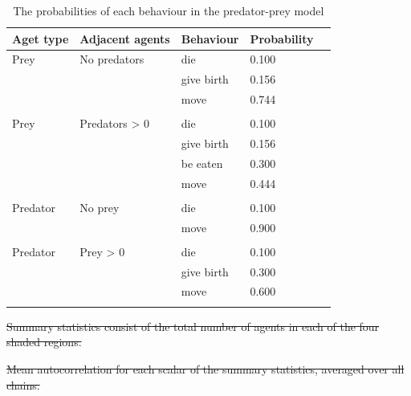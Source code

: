 \documentclass{article}
\providecommand{\DIFdeltex}[1]{{\protect\color{red}\sout{#1}}}                      %
\providecommand{\DIFdelbegin}{} %
\providecommand{\DIFdelFL}[1]{\DIFdel{#1}} %
\providecommand{\DIFaddbeginFL}{} %
\providecommand{\DIFaddendFL}{} %
\providecommand{\DIFdelendFL}{} %
\providecommand{\DIFdel}[1]{\texorpdfstring{\DIFdeltex{#1}}{}} %
\newcommand{\DIFscaledelfig}{0.5}
\newlength{\DIFdelgraphicswidth} %
\newlength{\DIFdelgraphicsheight} %
\newcommand{\DIFaddincludegraphics}[2][]{{\color{blue}\fbox{\DIFOincludegraphics[#1]{#2}}}} %
\newcommand{\DIFdelincludegraphics}[2][]{%
\sbox{\DIFdelgraphicsbox}{\DIFOincludegraphics[#1]{#2}}%
\settoboxwidth{\DIFdelgraphicswidth}{\DIFdelgraphicsbox} %
\settoboxtotalheight{\DIFdelgraphicsheight}{\DIFdelgraphicsbox} %
\scalebox{\DIFscaledelfig}{%
\parbox[b]{\DIFdelgraphicswidth}{\usebox{\DIFdelgraphicsbox}\\[-\baselineskip] \rule{\DIFdelgraphicswidth}{0em}}\llap{\resizebox{\DIFdelgraphicswidth}{\DIFdelgraphicsheight}{%
\setlength{\unitlength}{\DIFdelgraphicswidth}%
\begin{picture}(1,1)%
\thicklines\linethickness{2pt} %
{\color[rgb]{1,0,0}\put(0,0){\framebox(1,1){}}}%
{\color[rgb]{1,0,0}\put(0,0){\line( 1,1){1}}}%
{\color[rgb]{1,0,0}\put(0,1){\line(1,-1){1}}}%
\end{picture}%
}\hspace*{3pt}}} %
} %
\DeclareRobustCommand{\DIFdelbegin}{\DIFOdelbegin \let\includegraphics\DIFdelincludegraphics} %
\DeclareRobustCommand{\DIFaddbeginFL}{\DIFOaddbeginFL \let\includegraphics\DIFaddincludegraphics} %
\DeclareRobustCommand{\DIFaddendFL}{\DIFOaddendFL \let\includegraphics\DIFOincludegraphics} %
\DeclareRobustCommand{\DIFdelendFL}{\DIFOaddendFL \let\includegraphics\DIFOincludegraphics} %
\begin{document}
\DIFdelbegin %
\DIFdelendFL \DIFaddbeginFL \begin{table}[ht]
	\DIFaddendFL \begin{center}
		\begin{tabular}{llllc}
		\hline
		Aget type & Adjacent agents & Behaviour & Probability\\
		\hline
		Prey & No predators & die &        0.100\\
			& & give birth &        0.156\\
			& & move &        0.744\\
			& &&\\
		Prey & Predators > 0 & die &        0.100\\
			& & give birth &        0.156\\
			& & be eaten &        0.300\\
			& & move &        0.444\\
			& &&\\
		Predator  & No prey & die  &      0.100\\
			& & move &        0.900\\
			& &&\\
		Predator  & Prey > 0 & die  &      0.100\\
			& & give birth &        0.300\\
			& & move &        0.600\\
		\hline& 
		\end{tabular}
	\end{center}
	\caption{The probabilities of each behaviour in the predator-prey model}
	\label{rates}
\end{table}






\DIFdelbegin %
{%
\DIFdelFL{Summary statistics consist of the total number of agents in each of the four shaded regions.}}

{%
\DIFdelFL{Mean autocorrelation for each scalar of the summary statistics, averaged over all chains.}}
\end{document}
